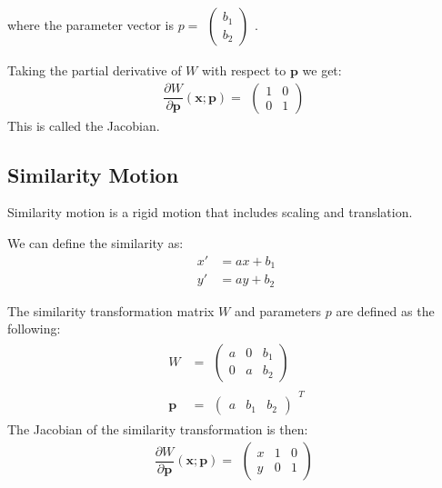 \documentclass{article}
\begin{document}
where the parameter vector is $p = \begin{matrix}\begin{pmatrix} b_1 \\ b_2 \end{pmatrix}\end{matrix}$.

Taking the partial derivative of $W$ with respect to $\bm{p}$ we get:
\begin{equation}
  \frac{\partial W}{\partial \bm{p}}(\bm{x}; \bm{p}) = \begin{matrix}
                        \begin{pmatrix} 1 & 0 \\ 0 & 1 \end{pmatrix}
                                       \end{matrix}
\end{equation}
This is called the Jacobian.

\subsection{Similarity Motion}
Similarity motion is a rigid motion that includes scaling and translation.

We can define the similarity as:
\begin{equation}
  \begin{aligned}
      x' &= ax + b_1 \\
      y' &= ay + b_2
    \end{aligned}
\end{equation}

The similarity transformation matrix $W$ and parameters $p$ are defined as the following:
\begin{equation}
  \begin{aligned}
    W &= \begin{matrix}
      \begin{pmatrix}
        a & 0 & b_1 \\
                0 & a & b_2
      \end{pmatrix}
    \end{matrix} \\
        \bm{p} &= \begin{matrix}
          \begin{pmatrix}
            a & b_1 & b_2
          \end{pmatrix}
        \end{matrix} ^ T
  \end{aligned}
\end{equation}
The Jacobian of the similarity transformation is then:
\begin{equation}
  \frac{\partial W}{\partial \bm{p}}(\bm{x}; \bm{p}) = \begin{matrix}
      \begin{pmatrix}
          x & 1 & 0 \\
          y & 0 & 1
      \end{pmatrix}
  \end{matrix}
\end{equation}
\end{document}
